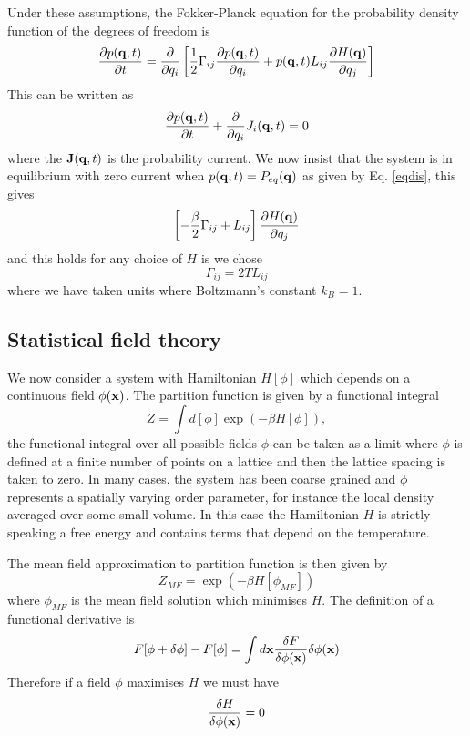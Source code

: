 Under these assumptions, the Fokker-Planck equation for the probability density function of the degrees of freedom is 
\begin{equation}
\frac{\partial p({\bf q},t)}{\partial t} = \frac{\partial}{\partial q_i} \left[\frac{1}{2}\Gamma_{ij} \frac{\partial p({\bf q},t)}{\partial q_i} + p({\bf q},t) L_{ij}\frac{\partial H({\bf q})}{ \partial q_j}\right]
\end{equation}
This can be written as 
\begin{equation}
\frac{\partial p({\bf q},t)}{\partial t} +\frac{\partial}{\partial q_i}J_i({\bf q},t)=0
\end{equation}
where the ${\bf J}({\bf q},t)$ is the probability current. We now insist that the system is in equilibrium with zero current when $p({\bf q},t)= P_{eq}({\bf q})$ as given by Eq. \eqref{eqdis}, this gives
\begin{equation}
\left[-\frac{\beta}{2}\Gamma_{ij} + L_{ij}\right]\frac{\partial H({\bf q})}{ \partial q_j}
\end{equation}
and this holds for any choice of $H$ is we chose
\begin{equation}
\Gamma_{ij}= 2T L_{ij}
\end{equation}
where we have taken units where Boltzmann's constant $k_B=1$. 

\subsection{Statistical field theory}

We now consider a system with Hamiltonian $H[\phi]$ which depends on a continuous field $\phi({\bf x})$. The partition function is given by a functional integral
\begin{equation}
Z = \int d[\phi] \exp(-\beta H[\phi]),
\end{equation}
the functional integral over all possible fields $\phi$ can be taken as a limit where $\phi$ is defined at a finite number of points on a lattice and then the lattice spacing is taken to zero. 
In many cases, the system has been coarse grained and $\phi$ represents a spatially varying order parameter, for instance the local density averaged over some small volume. In this case the Hamiltonian $H$ is strictly speaking a free energy and contains terms that depend on the temperature.

The mean field approximation to partition function is then given by
\begin{equation}
Z _{MF}= \exp(-\beta H[\phi_{MF}])
\end{equation} 
where $\phi_{MF}$ is the mean field solution which minimises $H$. The definition of a functional derivative is
\begin{equation}
F[\phi+\delta\phi]-F[\phi]= \int d{\bf x} \frac{\delta F}{\delta\phi({\bf x})} \delta\phi({\bf x})
\end{equation}
Therefore if a field $\phi$ maximises $H$ we must have 
\begin{equation}
\frac{\delta H}{\delta\phi({\bf x})}=0
\end{equation}

